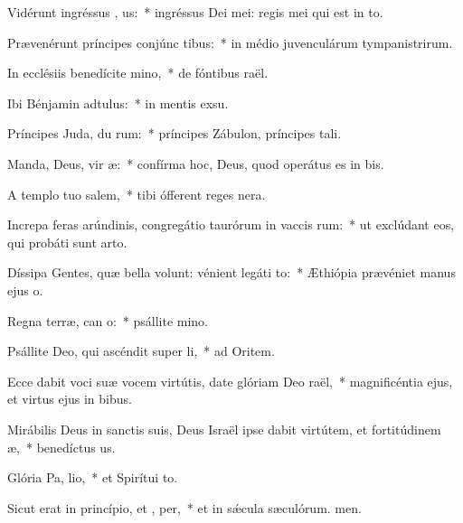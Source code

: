\item Vidérunt ingréssus , us:~* ingréssus Dei mei: regis mei qui est in to.
\item Prævenérunt príncipes conjúnc tibus:~* in médio juvenculárum tympanistrirum.
\item In ecclésiis benedícite  mino,~* de fóntibus raël.
\item Ibi Bénjamin adtulus:~* in mentis exsu.
\item Príncipes Juda, du rum:~* príncipes Zábulon, príncipes tali.
\item Manda, Deus, vir æ:~* confírma hoc, Deus, quod operátus es in bis.
\item A templo tuo  salem,~* tibi ófferent reges nera.
\item Increpa feras arúndinis, congregátio taurórum in vaccis rum:~* ut exclúdant eos, qui probáti sunt arto.
\item Díssipa Gentes, quæ bella volunt: vénient legáti  to:~* Æthiópia prævéniet manus ejus o.
\item Regna terræ, can o:~* psállite mino.
\item Psállite Deo, qui ascéndit super  li,~* ad Oritem.
\item Ecce dabit voci suæ vocem virtútis, date glóriam Deo  raël,~* magnificéntia ejus, et virtus ejus in bibus.
\item Mirábilis Deus in sanctis suis, Deus Israël ipse dabit virtútem, et fortitúdinem  æ,~* benedíctus us.
\item Glória Pa,  lio,~* et Spirítui to.
\item Sicut erat in princípio, et ,  per,~* et in sǽcula sæculórum. men.
